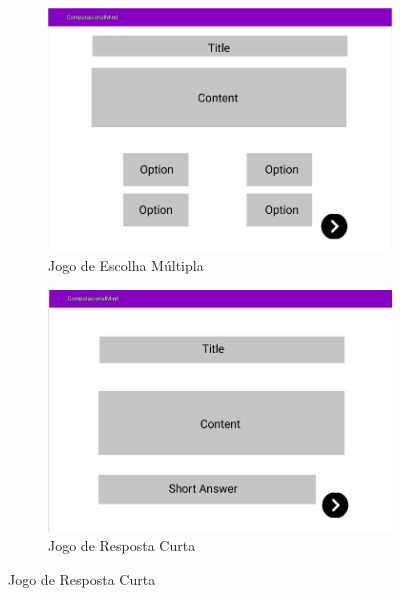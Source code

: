 \documentclass[11pt,a4paper]{report}
\begin{document}
\begin{figure}
\begin{subfigure}[b]{0.4\textwidth}
         \includegraphics[width=\textwidth]{MockUserGameMC.png}
         \caption{Jogo de Escolha Múltipla}
         \label{fig:MockUserGameMC}
     \end{subfigure}
     \hfill
     \begin{subfigure}[b]{0.4\textwidth}
         \centering
         \includegraphics[width=\textwidth]{MockUserGameSA.png}
         \caption{Jogo de Resposta Curta}
         \label{fig:MockUserGameSA}
     \end{subfigure}
\end{figure}
\end{document}
